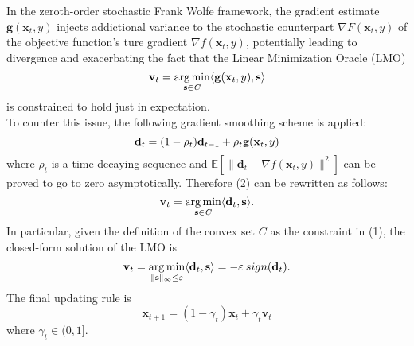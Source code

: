 In the zeroth-order stochastic Frank Wolfe framework, the gradient estimate $\mathbf{g}(\mathbf{x}_t,y)$ injects addictional variance to the stochastic counterpart $\nabla F(\mathbf{x}_t,y)$ of the objective function's ture gradient $\nabla f(\mathbf{x}_{t},y)$, potentially leading to divergence and exacerbating the fact that the Linear Minimization Oracle (LMO)
\begin{equation}
	\mathbf{v}_t = \operatorname*{arg\,min}_{\mathbf{s}\in\mathit{C}}\langle \mathbf{g}(\mathbf{x}_t,y),\mathbf{s}\rangle	
\end{equation}
is constrained to hold just in expectation.\\ 
To counter this issue, the following gradient smoothing scheme is applied:
\begin{equation}
	\mathbf{d}_{t} = (1-\rho_t)\mathbf{d}_{t-1} + \rho_t\mathbf{g}(\mathbf{x}_t,y)\\
\end{equation}
where $\rho_t$ is a time-decaying sequence and $\mathbb{E}[\lVert\mathbf{d}_{t}-\nabla f(\mathbf{x}_{t},y) \rVert^2]$ can be proved to go to zero asymptotically. Therefore (2) can be rewritten as follows:
\begin{equation}
	\mathbf{v}_t = \operatorname*{arg\,min}_{\mathbf{s}\in\mathit{C}}\langle \mathbf{d}_t,\mathbf{s}\rangle.
\end{equation}
In particular, given the definition of the convex set $\mathit{C}$ as the constraint in (1), the closed-form solution of the LMO is 
\begin{equation}
	\mathbf{v}_t = \operatorname*{arg\,min}_{\lVert \mathbf{s}\rVert_{\infty}\leq\varepsilon}\langle \mathbf{d}_t,\mathbf{s}\rangle= -\varepsilon \:sign(\mathbf{d}_{t}).	
\end{equation}
The final updating rule is
\begin{equation}
	\mathbf{x}_{t+1} = (1-\gamma_t)\mathbf{x}_t + \gamma_t\mathbf{v}_t
\end{equation}
where $\gamma_t\in(0,1]$.